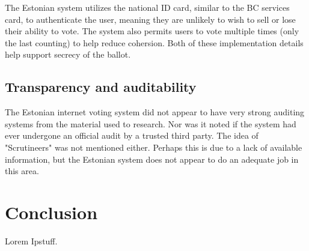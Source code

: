 \documentclass[a4paper, 11pt]{article} %
\begin{document}
The Estonian system utilizes the national ID card, similar to the BC services card, to authenticate the user, meaning they are unlikely to wish to sell or lose their ability to vote. The system also permits users to vote multiple times (only the last counting) to help reduce cohersion. Both of these implementation details help support secrecy of the ballot.

\subsection*{Transparency and auditability}

The Estonian internet voting system did not appear to have very strong auditing systems from the material used to research. Nor was it noted if the system had ever undergone an official audit by a trusted third party. The idea of "Scrutineers" was not mentioned either. Perhaps this is due to a lack of available information, but the Estonian system does not appear to do an adequate job in this area.

\section*{Conclusion}
Lorem Ipstuff.







\end{document}
